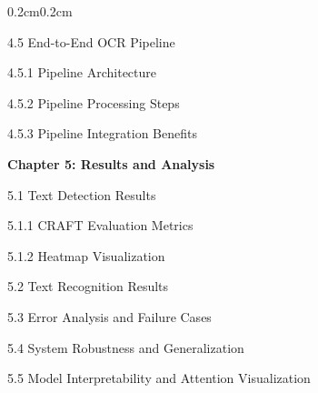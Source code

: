 {\begin{adjustwidth}{0.2cm}{0.2cm}
    { \hspace{0.5cm} 4.5 End-to-End OCR Pipeline\dotfill\pageref{sec:end-to-end-pipeline}\par}
    { \hspace{1cm} 4.5.1 Pipeline Architecture\dotfill\pageref{subsec:pipeline-architecture}\par}
    { \hspace{1cm} 4.5.2 Pipeline Processing Steps\dotfill\pageref{subsec:pipeline-steps}\par}
    { \hspace{1cm} 4.5.3 Pipeline Integration Benefits\dotfill\pageref{subsec:pipeline-benefits}\par}

    \vspace{0.5cm}
    { \textbf{Chapter 5: Results and Analysis}\dotfill\pageref{ch:results}\par}
    { \hspace{0.5cm} 5.1 Text Detection Results\dotfill\pageref{sec:detection-results}\par}
    { \hspace{1cm} 5.1.1 CRAFT Evaluation Metrics\dotfill\pageref{subsec:craft-evaluation}\par}
    { \hspace{1cm} 5.1.2 Heatmap Visualization\dotfill\pageref{subsec:headmap_visualization}\par}
    { \hspace{0.5cm} 5.2 Text Recognition Results\dotfill\pageref{sec:recognition-results}\par}
    { \hspace{0.5cm} 5.3 Error Analysis and Failure Cases\dotfill\pageref{sec:error-analysis}\par}
    { \hspace{0.5cm} 5.4 System Robustness and Generalization\dotfill\pageref{sec:robustness}\par}
    { \hspace{0.5cm} 5.5 Model Interpretability and Attention Visualization\dotfill\pageref{sec:interpretability}\par}


\end{adjustwidth}}
